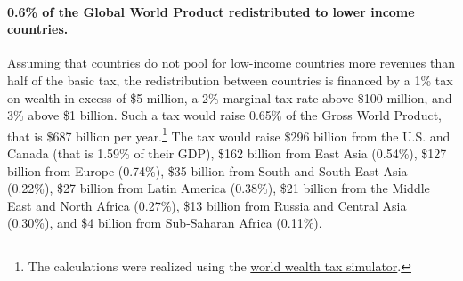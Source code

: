\documentclass[12pt,english]{article}
\begin{document}
\paragraph{0.6\% of the Global World Product redistributed to lower income countries.} Assuming that countries do not pool for low-income countries more revenues than half of the basic tax, the redistribution between countries is financed by a 1\% tax on wealth in excess of \$5 million, a 2\% marginal tax rate above \$100 million, and 3\% above \$1 billion. Such a tax would raise 0.65\% of the Gross World Product, that is \$687 %
billion per year.\footnote{The calculations were realized using the \href{https://wid.world/world-wealth-tax-simulator/}{world wealth tax simulator}.} The tax would raise \$296 billion from the U.S. and Canada (that is 1.59\% of their GDP), 
\$162 billion from East Asia (0.54\%), \$127 billion from Europe (0.74\%), \$35 billion from South and South East Asia (0.22\%), \$27 billion from Latin America (0.38\%), \$21 billion from the Middle East and North Africa (0.27\%), \$13 billion from Russia and Central Asia (0.30\%), and \$4 billion from Sub-Saharan Africa (0.11\%). 
\end{document}
